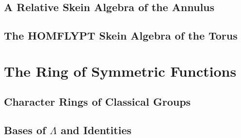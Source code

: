 \subsection{A Relative Skein Algebra of the Annulus}

\subsection{The HOMFLYPT Skein Algebra of the Torus}



\section{The Ring of Symmetric Functions}

\subsection{Character Rings of Classical Groups}

\subsection{Bases of $\Lambda$ and Identities}